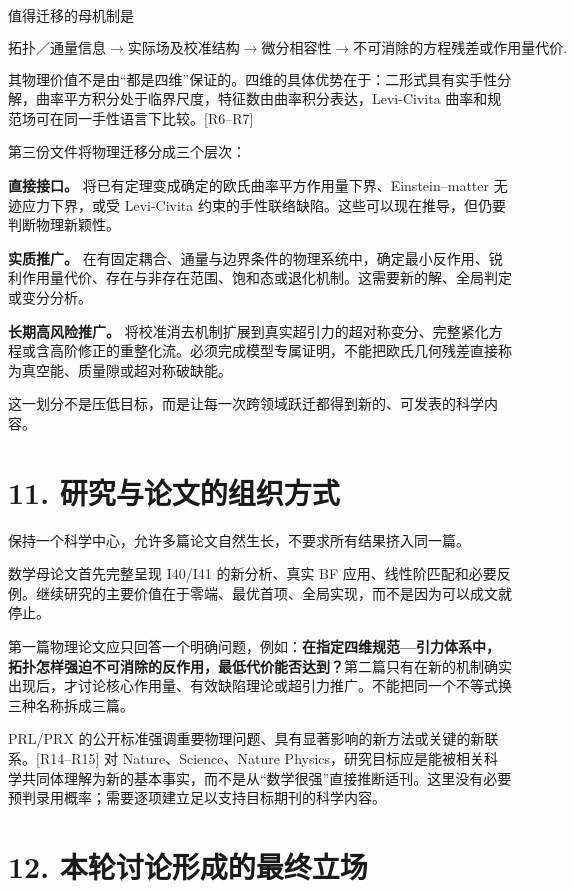 \documentclass[UTF8,a4paper,11pt,fontset=fandol]{ctexart}
\begin{document}
值得迁移的母机制是

\[
\text{拓扑／通量信息}
\longrightarrow\text{实际场及校准结构}
\longrightarrow\text{微分相容性}
\longrightarrow\text{不可消除的方程残差或作用量代价}.
\tag{10}
\]

其物理价值不是由``都是四维''保证的。四维的具体优势在于：二形式具有实手性分解，曲率平方积分处于临界尺度，特征数由曲率积分表达，Levi-Civita
曲率和规范场可在同一手性语言下比较。{[}R6--R7{]}

第三份文件将物理迁移分成三个层次：

\textbf{直接接口。}
将已有定理变成确定的欧氏曲率平方作用量下界、Einstein--matter
无迹应力下界，或受 Levi-Civita
约束的手性联络缺陷。这些可以现在推导，但仍要判断物理新颖性。

\textbf{实质推广。}
在有固定耦合、通量与边界条件的物理系统中，确定最小反作用、锐利作用量代价、存在与非存在范围、饱和态或退化机制。这需要新的解、全局判定或变分分析。

\textbf{长期高风险推广。}
将校准消去机制扩展到真实超引力的超对称变分、完整紧化方程或含高阶修正的重整化流。必须完成模型专属证明，不能把欧氏几何残差直接称为真空能、质量隙或超对称破缺能。

这一划分不是压低目标，而是让每一次跨领域跃迁都得到新的、可发表的科学内容。

\section{11.
研究与论文的组织方式}\label{ux7814ux7a76ux4e0eux8bbaux6587ux7684ux7ec4ux7ec7ux65b9ux5f0f}

保持一个科学中心，允许多篇论文自然生长，不要求所有结果挤入同一篇。

数学母论文首先完整呈现 I40/I41 的新分析、真实 BF
应用、线性阶匹配和必要反例。继续研究的主要价值在于零端、最优首项、全局实现，而不是因为可以成文就停止。

第一篇物理论文应只回答一个明确问题，例如：\textbf{在指定四维规范---引力体系中，拓扑怎样强迫不可消除的反作用，最低代价能否达到？}第二篇只有在新的机制确实出现后，才讨论核心作用量、有效缺陷理论或超引力推广。不能把同一个不等式换三种名称拆成三篇。

PRL/PRX
的公开标准强调重要物理问题、具有显著影响的新方法或关键的新联系。{[}R14--R15{]}
对 Nature、Science、Nature
Physics，研究目标应是能被相关科学共同体理解为新的基本事实，而不是从``数学很强''直接推断适刊。这里没有必要预判录用概率；需要逐项建立足以支持目标期刊的科学内容。

\section{12.
本轮讨论形成的最终立场}\label{ux672cux8f6eux8ba8ux8bbaux5f62ux6210ux7684ux6700ux7ec8ux7acbux573a}
\end{document}
